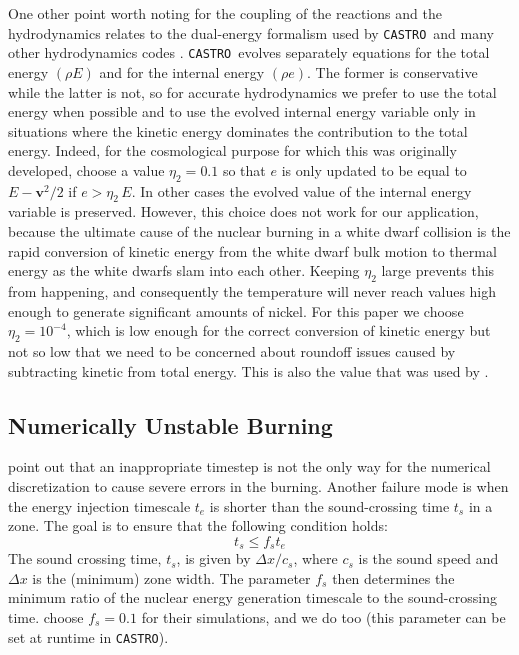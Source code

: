\documentclass[twocolumn,numberedappendix]{../aastex6}
\newcommand{\castro}{\texttt{CASTRO}}
\begin{document}
One other point worth noting for the coupling of the reactions
and the hydrodynamics relates to the dual-energy formalism used
by \castro\ and many other hydrodynamics codes \cite{bryan:1995}.
\castro\ evolves separately equations for the total energy $(\rho E)$ and
for the internal energy $(\rho e)$. The former is conservative while the latter
is not, so for accurate hydrodynamics we prefer to use the total
energy when possible and to use the evolved internal energy variable
only in situations where the kinetic energy dominates the contribution
to the total energy. Indeed, for the cosmological purpose for which
this was originally developed, \cite{ENZO} choose a value $\eta_2 = 0.1$
so that $e$ is only updated to be equal to $E - \mathbf{v}^2/2$ if
$e > \eta_2\, E$. In other cases the evolved value of the internal
energy variable is preserved. However, this choice does not work
for our application, because the ultimate cause of the nuclear
burning in a white dwarf collision is the rapid conversion of
kinetic energy from the white dwarf bulk motion to thermal energy
as the white dwarfs slam into each other. Keeping $\eta_2$ large
prevents this from happening, and consequently the temperature
will never reach values high enough to generate significant
amounts of nickel. For this paper we choose $\eta_2 = 10^{-4}$,
which is low enough for the correct conversion of kinetic energy
but not so low that we need to be concerned about roundoff issues
caused by subtracting kinetic from total energy. This is also
the value that was used by \cite{hawley:2012}.

\subsection{Numerically Unstable Burning}
\label{sec:unstable_burning}

\citet{kushnir:2013} point out that an inappropriate timestep is 
not the only way for the numerical discretization to cause 
severe errors in the burning. Another failure mode is when
the energy injection timescale
$t_e$ is shorter than the sound-crossing time $t_s$ in a zone.
The goal is to ensure that the following condition holds:
\begin{equation}
  t_s \leq f_{s} t_e \label{eq:burning_limiter_2}
\end{equation}
The sound crossing time, $t_s$, is given by $\Delta x / c_s$, 
where $c_s$ is the sound speed and $\Delta x$ is the (minimum) 
zone width. The parameter $f_{s}$ then determines the minimum
ratio of the nuclear energy generation timescale to the 
sound-crossing time. \citet{kushnir:2013} choose $f_{s} = 0.1$ 
for their simulations, and we do too (this parameter can be set 
at runtime in \castro).
\end{document}
